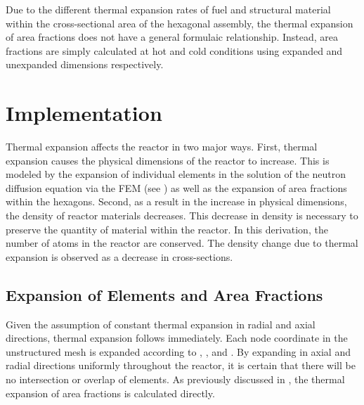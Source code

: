     Due to the different thermal expansion rates of fuel and structural material 
    within the cross-sectional area of the hexagonal assembly, the thermal 
    expansion of area fractions does not have a general formulaic relationship.
    Instead, area fractions are simply calculated at hot and cold conditions
    using expanded and unexpanded dimensions respectively. 

\section{Implementation}
  Thermal expansion affects the reactor in two major ways. First, thermal 
  expansion causes the physical dimensions of the reactor to increase. This is 
  modeled by the expansion of individual elements in the solution of the neutron 
  diffusion equation via the FEM
  (see ) as well as the expansion of area fractions
  within the hexagons. Second, as a result in the increase in physical 
  dimensions, the density of reactor materials decreases. This decrease in 
  density is necessary to preserve the quantity of material within the reactor.
  In this derivation, the number of atoms in the reactor are conserved. The 
  density change due to thermal expansion is observed as a decrease in 
  cross-sections.

  \subsection{Expansion of Elements and Area Fractions}
    Given the assumption of constant thermal expansion in radial and axial
    directions, thermal expansion follows immediately. Each node coordinate in
    the unstructured mesh is expanded according to , 
    , and . By expanding in axial and radial
    directions uniformly throughout the reactor, it is certain that there will 
    be no intersection or overlap of elements. As previously discussed in
    , the thermal expansion of
    area fractions is calculated directly.

